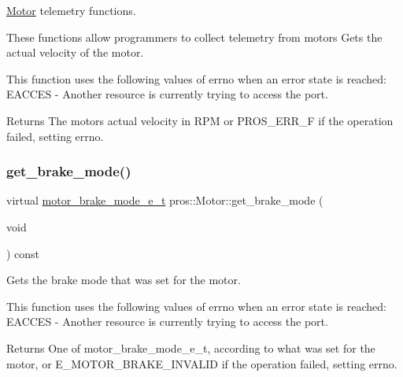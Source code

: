 \mbox{\hyperlink{classpros_1_1Motor}{Motor}} telemetry functions. 

These functions allow programmers to collect telemetry from motors Gets the actual velocity of the motor.

This function uses the following values of errno when an error state is reached\+: E\+A\+C\+C\+ES -\/ Another resource is currently trying to access the port.

\begin{DoxyReturn}{Returns}
The motor\textquotesingle{}s actual velocity in R\+PM or P\+R\+O\+S\+\_\+\+E\+R\+R\+\_\+F if the operation failed, setting errno. 
\end{DoxyReturn}
\mbox{\label{classpros_1_1Motor_acc0c2225d2b713b73e1caee1a483a958}} 
\subsubsection{\texorpdfstring{get\_brake\_mode()}{get\_brake\_mode()}}
{\footnotesize\ttfamily virtual \mbox{\hyperlink{motors_8h_aa324a2881696428c9e3684f9ad23a83b}{motor\+\_\+brake\+\_\+mode\+\_\+e\+\_\+t}} pros\+::\+Motor\+::get\+\_\+brake\+\_\+mode (\begin{DoxyParamCaption}\item[{void}]{ }\end{DoxyParamCaption}) const\hspace{0.3cm}{\ttfamily [virtual]}}



Gets the brake mode that was set for the motor. 

This function uses the following values of errno when an error state is reached\+: E\+A\+C\+C\+ES -\/ Another resource is currently trying to access the port.

\begin{DoxyReturn}{Returns}
One of motor\+\_\+brake\+\_\+mode\+\_\+e\+\_\+t, according to what was set for the motor, or E\+\_\+\+M\+O\+T\+O\+R\+\_\+\+B\+R\+A\+K\+E\+\_\+\+I\+N\+V\+A\+L\+ID if the operation failed, setting errno. 
\end{DoxyReturn}
\mbox{\label{classpros_1_1Motor_a502eaf3859452721e2327e53ab3f34d8}} 
